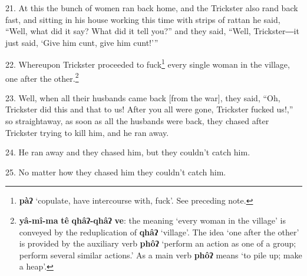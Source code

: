21. At this the bunch of women ran back home, and the Trickster also rand back
fast, and sitting in his house working this time with strips of rattan he said,
``Well, what did it say? What did it tell you?'' and they said, ``Well, Trickster―it
just said, `Give him cunt, give him cunt!'''

22. Whereupon Trickster proceeded to fuck\footnote{\textbf{pàʔ} `copulate, have intercourse with, fuck'. See preceding note.} every single woman in the village,
one after the other.\footnote{\textbf{yâ-mî-ma} \textbf{tê} \textbf{qhâʔ-qhâʔ} \textbf{ve}: the meaning `every woman in the village' is conveyed by the reduplication of \textbf{qhâʔ} `village'. The idea `one after the other' is provided by the auxiliary verb \textbf{phôʔ} `perform an action as one of a group; perform several similar actions.' As a main verb \textbf{phôʔ} means `to pile up; make a heap'.}

23. Well, when all their husbands came back [from the war], they said, ``Oh, Trickster
did this and that to us! After you all were gone, Trickster fucked us!,'' so straightaway,
as soon as all the husbands were back, they chased after Trickster trying to kill
him, and he ran away.

24. He ran away and they chased him, but they couldn't catch him.

25. No matter how they chased him they couldn't catch him.

